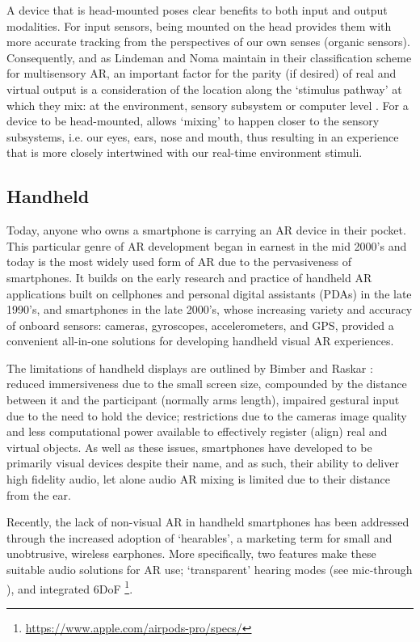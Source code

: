 A device that is head-mounted poses clear benefits to both input and output modalities. For input sensors, being mounted on the head provides them with more accurate tracking from the perspectives of our own senses (organic sensors). Consequently, and as Lindeman and Noma maintain in their classification scheme for multisensory AR, an important factor for the parity (if desired) of real and virtual output is a consideration of the location along the `stimulus pathway' at which they mix: at the environment, sensory subsystem or computer level \citeyearpar{lindeman2007}. For a device to be head-mounted, allows `mixing' to happen closer to the sensory subsystems, i.e. our eyes, ears, nose and mouth, thus resulting in an experience that is more closely intertwined with our real-time environment stimuli.

\subsection{Handheld}\label{sec: ar-forms-mobile}
Today, anyone who owns a smartphone is carrying an AR device in their pocket. This particular genre of AR development began in earnest in the mid 2000's and today is the most widely used form of AR due to the pervasiveness of smartphones. It builds on the early research and practice of handheld AR applications built on cellphones and personal digital assistants (PDAs) in the late 1990's, and smartphones in the late 2000's, whose increasing variety and accuracy of onboard sensors: cameras, gyroscopes, accelerometers, and GPS, provided a convenient all-in-one solutions for developing handheld visual AR experiences. 

The limitations of handheld displays are outlined by Bimber and Raskar \citeyearpar[pp. 79-83]{bimber2005}: reduced immersiveness due to the small screen size, compounded by the distance between it and the participant (normally arms length), impaired gestural input due to the need to hold the device; restrictions due to the cameras image quality and less computational power available to effectively register (align) real and virtual objects. As well as these issues, smartphones have developed to be primarily visual devices despite their name, and as such, their ability to deliver high fidelity audio, let alone audio AR mixing is limited due to their distance from the ear. 

Recently, the lack of non-visual AR in handheld smartphones has been addressed through the increased adoption of `hearables', a marketing term for small and unobtrusive, wireless earphones. More specifically, two features make these suitable audio solutions for AR use; `transparent' hearing modes (see mic-through \citep{lindeman2008}), and integrated 6DoF \footnote{\url{https://www.apple.com/airpods-pro/specs/}}.

